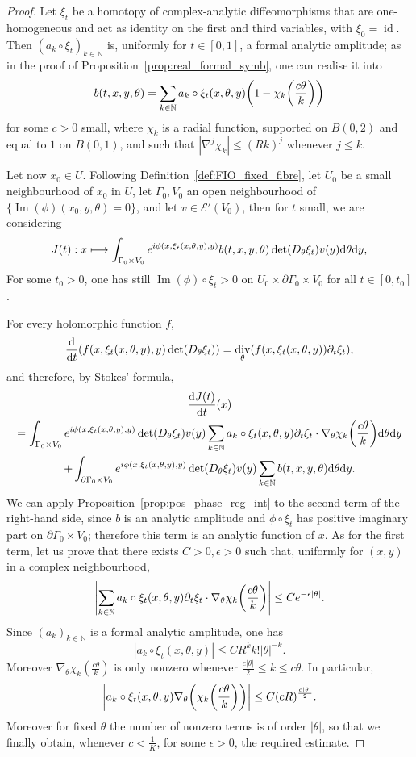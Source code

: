 \documentclass[AHL,Unicode,longabstracts,published]{cedram}
\DeclareMathOperator{\im}{Im}
\DeclareMathOperator{\divv}{div}
\DeclareMathOperator{\idd}{id}
\newcommand{\clE}{\mathcal{E}}
\newcommand\1{\mathds{1}}
\newcommand{\N}{\mathbb{N}}
\newcommand{\dd}{\mathrm{d}}
\let\oldmapsto\mapsto
\renewcommand*{\mapsto}{\mathchoice{\longmapsto}{\oldmapsto}{\oldmapsto}{\oldmapsto}}
\let\originalleft\left
\let\originalright\right
\renewcommand{\left}{\mathopen{}\mathclose\bgroup\originalleft}
\renewcommand{\right}{\aftergroup\egroup\originalright}
\begin{document}
\begin{proof}
Let $\xi_t$ be a homotopy of complex-analytic diffeomorphisms that are one-homogeneous and act as identity on the first and third variables, with $\xi_0=\idd$. Then $(a_k\circ \xi_t)_{k\in \N}$ is, uniformly for $t\in [0,1]$, a formal analytic amplitude; as in the proof of Proposition~\ref{prop:real_formal_symb}, one can realise it into
\[
b(t,x,y,\theta)=\sum_{k\in \N}a_k\circ
\xi_t(x,\theta,y)\left(1-\chi_k\left(\frac{c\theta}{k}\right)\right)
\]
for some $c>0$ small, where $\chi_k$ is a radial function, supported on $B(0,2)$ and equal to $1$ on $B(0,1)$, and such that $|\nabla^j\chi_k|\leq (Rk)^j$ whenever $j\leq k$.

Let now $x_0\in U$. Following Definition~\ref{def:FIO_fixed_fibre}, let $U_0$ be a small neighbourhood of $x_0$ in $U$, let $\Gamma_0,V_0$ an open neighbourhood of $\{\im(\phi)(x_0,y,\theta)=0\}$, and let $v\in \clE'(V_0)$, then for $t$ small, we are considering
\[
J(t):x\mapsto \int_{\Gamma_0\times V_0 } e^{i\phi(x,\xi_t(x,\theta,y),y)}b(t,x,y,\theta)\det(D_{\theta}\xi_t)v(y)\dd
\theta\dd y,
\]
For some $t_0>0$, one has still $\im(\phi)\circ \xi_t>0$ on $U_0\times \partial \Gamma_0\times V_0$ for all $t\in [0,t_0]$.

For every holomorphic function $f$,
\[
\frac{\dd}{\dd t}(f(x,\xi_t(x,\theta,y),y)\det(D_{\theta}\xi_t))=\divv_{\theta}\left(f(x,\xi_t(x,\theta,y))\partial_t\xi_t\right),
\]
and therefore, by Stokes' formula,
\begin{multline}\label{eq:Jprime}
\frac{\dd J(t)}{\dd t}(x)\\
=\int_{\Gamma_0\times V_0}e^{i\phi(x,\xi_t(x,\theta,y),y)}\det(D_{\theta}\xi_t)v(y)\sum_{k\in
\N}a_k\circ\xi_t(x,\theta,y) \partial_t\xi_t\cdot
\nabla_{\theta}\chi_k\left(\frac{c\theta}{k}\right)\dd
\theta \dd y\\
+\int_{\partial \Gamma_0\times V_0}e^{i\phi(x,\xi_t(x,\theta,y),y)}\det(D_{\theta}\xi_t)v(y)\sum_{k\in
\N}b(t,x,y,\theta)\dd
\theta \dd y.
\end{multline}
We can apply Proposition~\ref{prop:pos_phase_reg_int} to the second term of the right-hand side, since $b$ is an analytic amplitude and $\phi\circ\xi_t$ has positive imaginary part on $\partial \Gamma_0\times V_0$; therefore this term is an analytic function of $x$. As for the first term, let us prove that there exists $C>0, \epsilon>0$ such that, uniformly for $(x,y)$ in a complex neighbourhood,
\[
\left| \sum_{k\in
\N}a_k\circ\xi_t(x,\theta,y) \partial_t\xi_t\cdot
\nabla_{\theta}\chi_k\left(\frac{c\theta}{k}\right)\right|\leq Ce^{-\epsilon|\theta|}.
\]
Since $(a_k)_{k\in \N}$ is a formal analytic amplitude, one has
\[
|a_k\circ\xi_t(x,\theta,y)|\leq CR^kk!|\theta|^{-k}.
\]
Moreover $\nabla_{\theta}\chi_k(\frac{c\theta}{k})$ is only nonzero whenever $\frac{c|\theta|}{2}\leq k \leq c\theta$. In particular,
\[
\left|a_k\circ\xi_t(x,\theta,y)\nabla_{\theta}\left(\chi_k\left(\frac{c\theta}{k}\right)\right)\right|\leq C(cR)^{\frac{c|\theta|}{2}}.
\]
Moreover for fixed $\theta$ the number of nonzero terms is of order $|\theta|$, so that we finally obtain, whenever $c<\frac{1}{K}$, for some $\epsilon>0$, the required estimate.


\end{proof}
\end{document}

